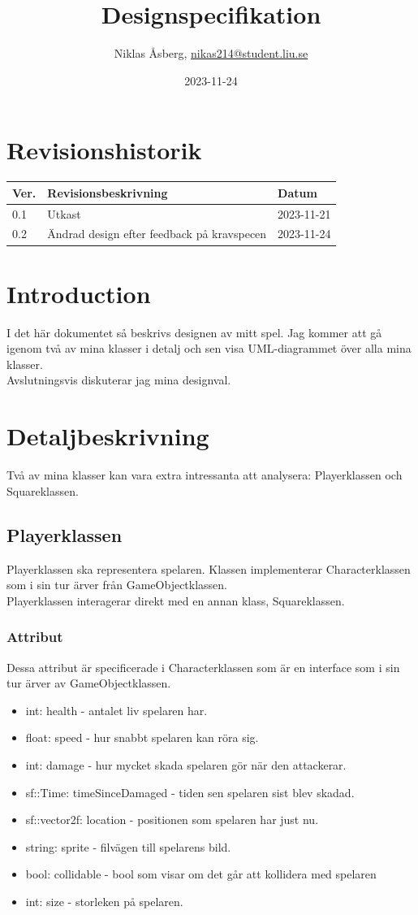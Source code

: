 \documentclass{TDP005mall}
\author{Niklas Åsberg, \url{nikas214@student.liu.se}}
\title{Designspecifikation}
\date{2023-11-24}
\begin{document}
\projectpage
\section{Revisionshistorik}
\begin{table}[!h]
\begin{tabularx}{\linewidth}{|l|X|l|}
\hline
Ver. & Revisionsbeskrivning & Datum \\\hline
0.1 & Utkast & 2023-11-21 \\\hline
0.2 & Ändrad design efter feedback på kravspecen & 2023-11-24 \\\hline
\end{tabularx}
\end{table}

\tableofcontents
\newpage

\section{Introduction}
I det här dokumentet så beskrivs designen av mitt spel. Jag kommer att gå igenom två av mina klasser i detalj och sen visa UML-diagrammet över alla mina klasser. \\
Avslutningsvis diskuterar jag mina designval.

\section{Detaljbeskrivning}
Två av mina klasser kan vara extra intressanta att analysera: Playerklassen och Squareklassen.

\subsection{Playerklassen}
Playerklassen ska representera spelaren. Klassen implementerar Characterklassen som i sin tur ärver från GameObjectklassen. \\
Playerklassen interagerar direkt med en annan klass, Squareklassen. 
\subsubsection{Attribut}
Dessa attribut är specificerade i Characterklassen som är en interface som i sin tur ärver av GameObjectklassen.
\begin{itemize}
  \item int: health - antalet liv spelaren har.
  \item float: speed - hur snabbt spelaren kan röra sig.
  \item int: damage - hur mycket skada spelaren gör när den attackerar.
  \item sf::Time: timeSinceDamaged - tiden sen spelaren sist blev skadad.
  \item sf::vector2f: location - positionen som spelaren har just nu.
  \item string: sprite - filvägen till spelarens bild.
  \item bool: collidable - bool som visar om det går att kollidera med spelaren
  \item int: size - storleken på spelaren.
\end{itemize}
\end{document}
